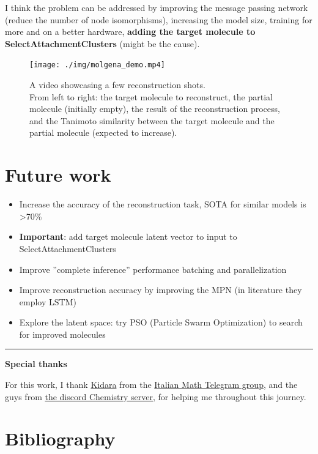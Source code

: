 \documentclass{article}
\begin{document}
I think the problem can be addressed by improving the message passing network (reduce the number of node isomorphisms),
increasing the model size, training for more and on a better hardware, \textbf{adding the target molecule to SelectAttachmentClusters} (might be the cause).


\begin{figure}[h]
\centering
\texttt{[image: ./img/molgena\_demo.mp4]}
\caption{
A video showcasing a few reconstruction shots.\\
From left to right: the target molecule to reconstruct, the partial molecule (initially empty), the result of the reconstruction process, and
the Tanimoto similarity between the target molecule and the partial molecule (expected to increase).
}
\end{figure}

\section{Future work}

\begin{itemize}
\item Increase the accuracy of the reconstruction task, SOTA for similar models is >70\%
\item \textbf{Important}: add target molecule latent vector to input to SelectAttachmentClusters
\item Improve ''complete inference'' performance batching and parallelization
\item Improve reconstruction accuracy by improving the MPN (in literature they employ LSTM)
\item Explore the latent space: try PSO (Particle Swarm Optimization) to search for improved molecules
\end{itemize}

\rule{}{0.5pt}

\textbf{Special thanks}

For this work, I thank \href{https://github.com/Kidara}{Kidara} from the \href{https://t.me/matematicaIT/369761}{Italian Math Telegram group},
and the guys from \href{https://discord.gg/jtD5nTyk}{the discord Chemistry server}, for helping me throughout this journey.

\section{Bibliography}

\printbibliography
\end{document}
